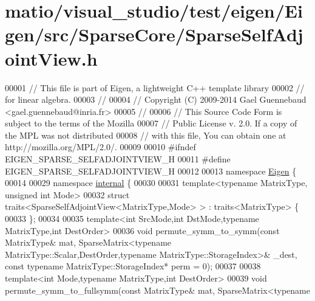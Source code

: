 \hypertarget{matio_2visual__studio_2test_2eigen_2_eigen_2src_2_sparse_core_2_sparse_self_adjoint_view_8h_source}{}\section{matio/visual\+\_\+studio/test/eigen/\+Eigen/src/\+Sparse\+Core/\+Sparse\+Self\+Adjoint\+View.h}
\label{matio_2visual__studio_2test_2eigen_2_eigen_2src_2_sparse_core_2_sparse_self_adjoint_view_8h_source}

\begin{DoxyCode}
00001 \textcolor{comment}{// This file is part of Eigen, a lightweight C++ template library}
00002 \textcolor{comment}{// for linear algebra.}
00003 \textcolor{comment}{//}
00004 \textcolor{comment}{// Copyright (C) 2009-2014 Gael Guennebaud <gael.guennebaud@inria.fr>}
00005 \textcolor{comment}{//}
00006 \textcolor{comment}{// This Source Code Form is subject to the terms of the Mozilla}
00007 \textcolor{comment}{// Public License v. 2.0. If a copy of the MPL was not distributed}
00008 \textcolor{comment}{// with this file, You can obtain one at http://mozilla.org/MPL/2.0/.}
00009 
00010 \textcolor{preprocessor}{#ifndef EIGEN\_SPARSE\_SELFADJOINTVIEW\_H}
00011 \textcolor{preprocessor}{#define EIGEN\_SPARSE\_SELFADJOINTVIEW\_H}
00012 
00013 \textcolor{keyword}{namespace }\hyperlink{namespace_eigen}{Eigen} \{ 
00014   
00029 \textcolor{keyword}{namespace }\hyperlink{namespaceinternal}{internal} \{
00030   
00031 \textcolor{keyword}{template}<\textcolor{keyword}{typename} MatrixType, \textcolor{keywordtype}{unsigned} \textcolor{keywordtype}{int} Mode>
00032 \textcolor{keyword}{struct }traits<SparseSelfAdjointView<MatrixType,Mode> > : traits<MatrixType> \{
00033 \};
00034 
00035 \textcolor{keyword}{template}<\textcolor{keywordtype}{int} SrcMode,\textcolor{keywordtype}{int} DstMode,\textcolor{keyword}{typename} MatrixType,\textcolor{keywordtype}{int} DestOrder>
00036 \textcolor{keywordtype}{void} permute\_symm\_to\_symm(\textcolor{keyword}{const} MatrixType& mat, SparseMatrix<typename
       MatrixType::Scalar,DestOrder,typename MatrixType::StorageIndex>& \_dest, \textcolor{keyword}{const} \textcolor{keyword}{typename} MatrixType::StorageIndex* perm = 0);
00037 
00038 \textcolor{keyword}{template}<\textcolor{keywordtype}{int} Mode,\textcolor{keyword}{typename} MatrixType,\textcolor{keywordtype}{int} DestOrder>
00039 \textcolor{keywordtype}{void} permute\_symm\_to\_fullsymm(\textcolor{keyword}{const} MatrixType& mat, SparseMatrix<typename

\end{DoxyCode}
